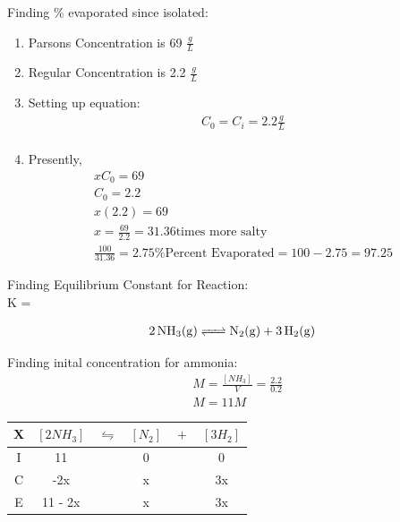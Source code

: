 \documentclass{article}  %
\begin{document}
Finding \% evaporated since isolated:
\begin{enumerate}
    \item Parsons Concentration is 69 $\frac{g}{L}$
    \item Regular Concentration is 2.2 $\frac{g}{L}$
    \item Setting up equation:
    \begin{equation*}
        \begin{aligned}
            C_0 = C_i = 2.2 \frac{g}{L} \\
        \end{aligned}
    \end{equation*}
    \item Presently, 
    \begin{equation*}
        \begin{aligned}
            xC_0 = 69 \\
            C_0 = 2.2 \\
            x(2.2) = 69 \\
            x = \frac{69}{2.2}  = 31.36 \text{times more salty}\\
            \frac{100}{31.36} = 2.75\% 
            \text{Percent Evaporated} = 100 - 2.75 = 97.25
        \end{aligned}
    \end{equation*}
\end{enumerate}

Finding Equilibrium Constant for Reaction: \\
K = 

\begin{equation*}
    \begin{aligned}
        \ce{2NH3_(g) <=> N2_(g) + 3H2_(g)}
    \end{aligned}
\end{equation*}

Finding inital concentration for ammonia:
\begin{equation*}
    \begin{aligned}
        &M = \frac{[NH_3]}{V} = \frac{2.2}{0.2} \\
        &M = 11M
    \end{aligned}
\end{equation*}

\begin{tabular}{c|c@{}c@{}c@{}c@{}c}
    \hline
    X   &   $[2NH_3]$ & ${}\leftrightharpoons{}$ & $[N_2]$ & ${}+{}$ & $[3H_2]$\\
    \hline
    I   & 11          &&   0                           &&  0       \\
    C   & -2x         &&   x                           &&  3x      \\
    E   & 11 - 2x     &&   x                           &&  3x      \\
    \hline
\end{tabular}
\end{document}
